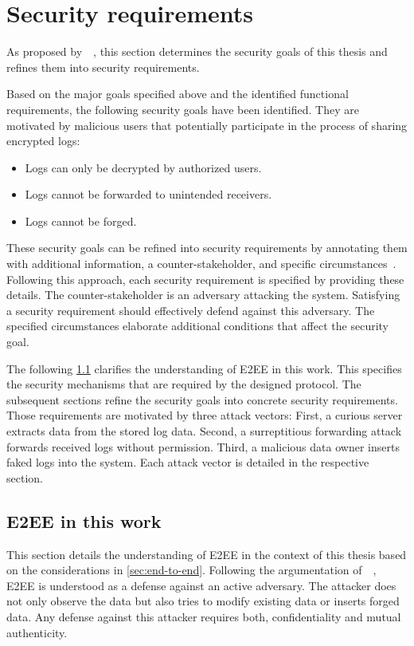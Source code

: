 \documentclass[../main.tex]{subfiles}
\begin{document}
\section{Security requirements}\label{security-requriements}
As proposed by~\citeauthor{Fabian2010}~\cite{Fabian2010}, this section determines the security goals of this thesis and refines them into security requirements.


Based on the major goals specified above and the identified functional requirements, the following security goals have been identified.
They are motivated by malicious users that potentially participate in the process of sharing encrypted logs:
\begin{itemize}
    \item Logs can only be decrypted by authorized users.
    \item Logs cannot be forwarded to unintended receivers.
    \item Logs cannot be forged.
  \end{itemize}

These security goals can be refined into security requirements by annotating them with additional information, a counter-stakeholder, and specific circumstances~\cite{Fabian2010}.
Following this approach, each security requirement is specified by providing these details.
The counter-stakeholder is an adversary attacking the system.
Satisfying a security requirement should effectively defend against this adversary.
The specified circumstances elaborate additional conditions that affect the security goal.

The following \cref{sec:end-to-end-thesis} clarifies the understanding of E2EE in this work.
This specifies the security mechanisms that are required by the designed protocol.
The subsequent sections refine the security goals into concrete security requirements.
Those requirements are motivated by three attack vectors:
First, a curious server extracts data from the stored log data.
Second, a surreptitious forwarding attack forwards received logs without permission.
Third, a malicious data owner inserts faked logs into the system.
Each attack vector is detailed in the respective section.

\subsection{E2EE in this work}
\label{sec:end-to-end-thesis}
This section details the understanding of E2EE in the context of this thesis based on the considerations in \cref{sec:end-to-end}.
Following the argumentation of~\citeauthor{Hale2022}~\cite{Hale2022}, E2EE is understood as a defense against an active adversary.
The attacker does not only observe the data but also tries to modify existing data or inserts forged data.
Any defense against this attacker requires both, confidentiality and mutual authenticity.
\end{document}
